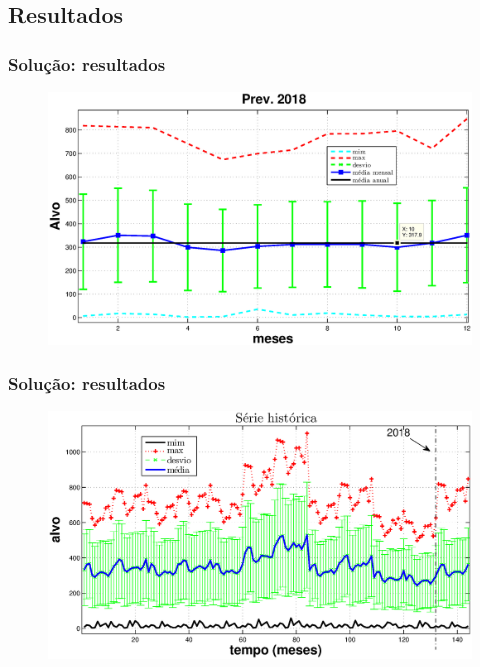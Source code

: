 \documentclass[xcolor=dvipsnames,xcolor=table]{beamer}
\begin{document}
\subsection{Resultados}
\begin{frame}\frametitle{Solução: resultados}
\begin{figure}[htpb] \begin{center} 
\includegraphics[width=0.9\columnwidth]{prev1}
\end{center}
\end{figure}
\end{frame}


\begin{frame}\frametitle{Solução: resultados}
\begin{figure}[htpb] \begin{center} 
\includegraphics[width=0.9\columnwidth]{prev2}
\end{center}
\end{figure}
\end{frame}
\end{document}
